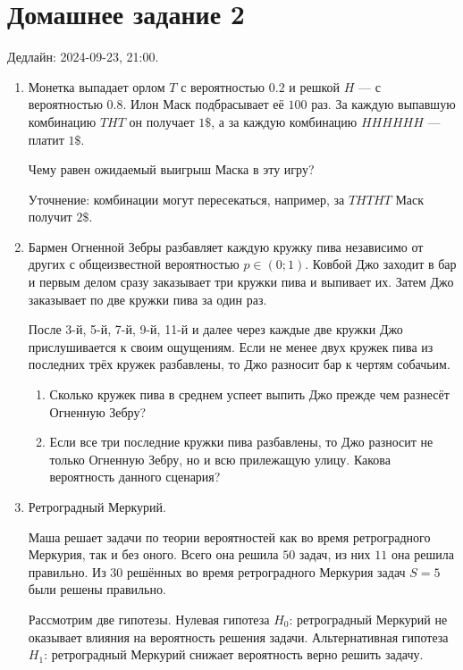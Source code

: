 \section*{Домашнее задание 2}

Дедлайн: 2024-09-23, 21:00.

\begin{enumerate}
\item Монетка выпадает орлом $T$ с вероятностью $0.2$ и решкой $H$ — с вероятностью $0.8$.
Илон Маск подбрасывает её $100$ раз. 
За каждую выпавшую комбинацию $THT$ он получает $1\$$, а за каждую комбинацию $HHHHHH$ — платит $1\$$.

Чему равен ожидаемый выигрыш Маска в эту игру?

Уточнение: комбинации могут пересекаться, например, за $THTHT$ Маск получит $2\$$.

\item Бармен Огненной Зебры разбавляет каждую кружку пива независимо от других с общеизвестной вероятностью $p \in (0;1)$.
Ковбой Джо заходит в бар и первым делом сразу заказывает три кружки пива и выпивает их.
Затем Джо заказывает по две кружки пива за один раз. 

После 3-й, 5-й, 7-й, 9-й, 11-й и далее через каждые две кружки Джо прислушивается к своим ощущениям.
Если не менее двух кружек пива из последних трёх кружек разбавлены, то Джо разносит бар к чертям собачьим. 

\begin{enumerate}
    \item Сколько кружек пива в среднем успеет выпить Джо прежде чем разнесёт Огненную Зебру?
    \item Если все три последние кружки пива разбавлены, то Джо разносит не только Огненную Зебру, 
    но и всю прилежащую улицу. Какова вероятность данного сценария?
\end{enumerate}


\item Ретроградный Меркурий. 

Маша решает задачи по теории вероятностей как во время ретроградного Меркурия, так и без оного. 
Всего она решила $50$ задач, из них $11$ она решила правильно. 
Из $30$ решённых во время ретроградного Меркурия задач $S = 5$ были решены правильно. 

Рассмотрим две гипотезы. 
Нулевая гипотеза $H_0$: ретроградный Меркурий не оказывает влияния на вероятность решения задачи.
Альтернативная гипотеза $H_1$: ретроградный Меркурий снижает вероятность верно решить задачу. 



\end{enumerate}
